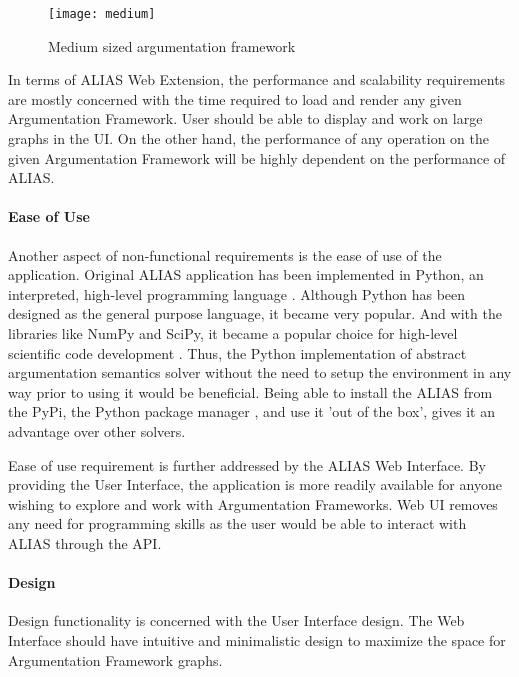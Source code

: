 \begin{figure}[h]
	\texttt{[image: medium]}
	\caption{Medium sized argumentation framework}
	\label{fig:mediumAF}
\end{figure}

In terms of ALIAS Web Extension, the performance and scalability requirements are mostly concerned with the time required to load and render any given Argumentation Framework. User should be able to display and work on large graphs in the UI. On the other hand, the performance of any operation on the given Argumentation Framework will be highly dependent on the performance of ALIAS.

\paragraph{Ease of Use}

Another aspect of non-functional requirements is the ease of use of the application. Original ALIAS application has been implemented in Python, an interpreted, high-level programming language \citep{millman2011python}. Although Python has been designed as the general purpose language, it became very popular. And with the libraries like NumPy and SciPy, it became a popular choice for high-level scientific code development \citep{perez2011python}. Thus, the Python implementation of abstract argumentation semantics solver without the need to setup the environment in any way prior to using it would be beneficial. Being able to install the ALIAS from the PyPi, the Python package manager \citep{pypi}, and use it 'out of the box', gives it an advantage over other solvers.

Ease of use requirement is further addressed by the ALIAS Web Interface. By providing the User Interface, the application is more readily available for anyone wishing to explore and work with Argumentation Frameworks. Web UI removes any need for programming skills as the user would be able to interact with ALIAS through the API.

\paragraph{Design} 
Design functionality is concerned with the User Interface design. The Web Interface should have intuitive and minimalistic design to maximize the space for Argumentation Framework graphs. 